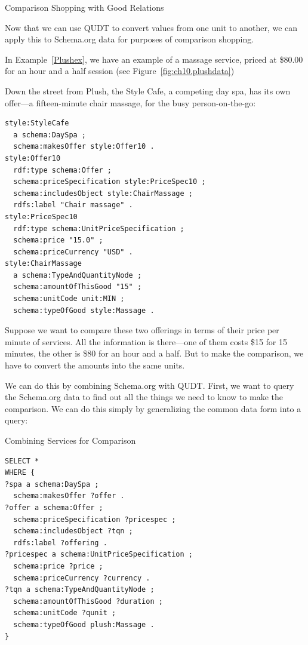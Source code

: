 \begin{challenge}{Comparison Shopping with Good Relations}
\label{chal:38}

Now that we can use QUDT to convert values from one unit to another, we
can apply this to Schema.org data for purposes of comparison
shopping.

In Example~\ref{Plushex}, we have an example of a massage
service, priced at \$80.00 for an hour and a half session (see Figure~\ref{fig:ch10.plushdata})

Down the street from Plush, the Style Cafe, a competing day spa, has 
its own offer---a
fifteen-minute chair massage, for the busy person-on-the-go:

\begin{lstlisting}
style:StyleCafe
  a schema:DaySpa ;
  schema:makesOffer style:Offer10 .
style:Offer10
  rdf:type schema:Offer ;
  schema:priceSpecification style:PriceSpec10 ;
  schema:includesObject style:ChairMassage ;
  rdfs:label "Chair massage" .
style:PriceSpec10
  rdf:type schema:UnitPriceSpecification ;
  schema:price "15.0" ;
  schema:priceCurrency "USD" .
style:ChairMassage
  a schema:TypeAndQuantityNode ;
  schema:amountOfThisGood "15" ;
  schema:unitCode unit:MIN ;  
  schema:typeOfGood style:Massage .
\end{lstlisting}



Suppose we want to compare these two offerings in terms of their price
per minute of services. All the information is there---one of them costs
\$15 for 15 minutes, the other is \$80 for an hour and a half. But to
make the comparison, we have to convert the amounts into the same units.

We can do this by combining Schema.org with QUDT. First, we want to
query the Schema.org data to find out all the things we need to know
to make the comparison. We can do this simply by generalizing the common
data form into a query:

\begin{query}Combining Services for Comparison\end{query}
\begin{lstlisting}
SELECT * 
WHERE {
?spa a schema:DaySpa ;
  schema:makesOffer ?offer .
?offer a schema:Offer ;
  schema:priceSpecification ?pricespec ;
  schema:includesObject ?tqn ;
  rdfs:label ?offering .
?pricespec a schema:UnitPriceSpecification ;
  schema:price ?price ;
  schema:priceCurrency ?currency .
?tqn a schema:TypeAndQuantityNode ;
  schema:amountOfThisGood ?duration ;
  schema:unitCode ?qunit ;  
  schema:typeOfGood plush:Massage .
}
\end{lstlisting}


\end{challenge}
